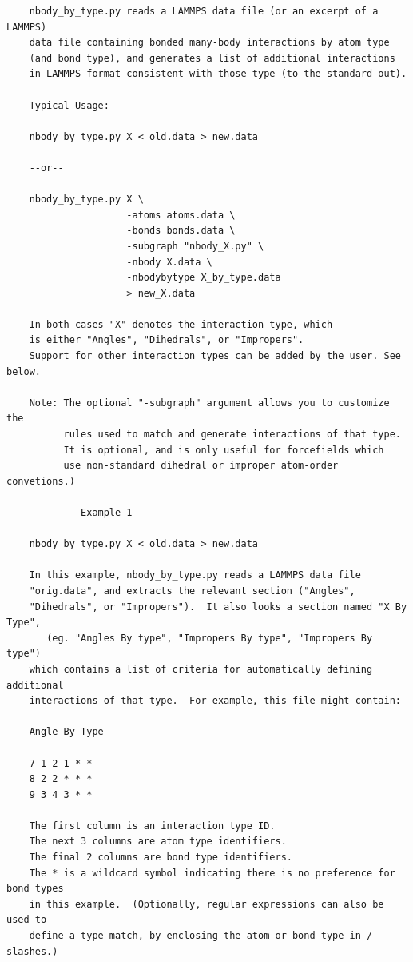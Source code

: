 \documentclass[11pt]{article}
\begin{document}
\begin{verbatim}
    nbody_by_type.py reads a LAMMPS data file (or an excerpt of a LAMMPS)
    data file containing bonded many-body interactions by atom type
    (and bond type), and generates a list of additional interactions
    in LAMMPS format consistent with those type (to the standard out).

    Typical Usage:

    nbody_by_type.py X < old.data > new.data

    --or--

    nbody_by_type.py X \
                     -atoms atoms.data \
                     -bonds bonds.data \
                     -subgraph "nbody_X.py" \
                     -nbody X.data \
                     -nbodybytype X_by_type.data
                     > new_X.data

    In both cases "X" denotes the interaction type, which 
    is either "Angles", "Dihedrals", or "Impropers".
    Support for other interaction types can be added by the user. See below.
    
    Note: The optional "-subgraph" argument allows you to customize the
          rules used to match and generate interactions of that type.
          It is optional, and is only useful for forcefields which
          use non-standard dihedral or improper atom-order convetions.)

    -------- Example 1 -------

    nbody_by_type.py X < old.data > new.data

    In this example, nbody_by_type.py reads a LAMMPS data file 
    "orig.data", and extracts the relevant section ("Angles", 
    "Dihedrals", or "Impropers").  It also looks a section named "X By Type",
       (eg. "Angles By type", "Impropers By type", "Impropers By type")
    which contains a list of criteria for automatically defining additional 
    interactions of that type.  For example, this file might contain:

    Angle By Type

    7 1 2 1 * *
    8 2 2 * * *
    9 3 4 3 * *

    The first column is an interaction type ID.
    The next 3 columns are atom type identifiers.
    The final 2 columns are bond type identifiers.
    The * is a wildcard symbol indicating there is no preference for bond types
    in this example.  (Optionally, regular expressions can also be used to
    define a type match, by enclosing the atom or bond type in / slashes.)


\end{verbatim}
\end{document}
